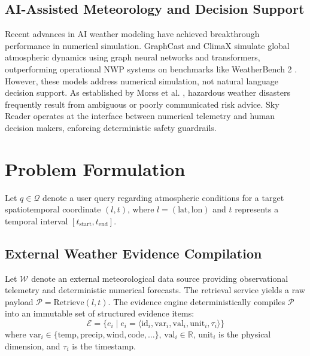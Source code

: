 \documentclass[conference]{IEEEtran}
\begin{document}
\subsection{AI-Assisted Meteorology and Decision Support}
Recent advances in AI weather modeling have achieved breakthrough performance in numerical simulation. GraphCast \cite{lam2023graphcast} and ClimaX \cite{nguyen2023climax} simulate global atmospheric dynamics using graph neural networks and transformers, outperforming operational NWP systems on benchmarks like WeatherBench 2 \cite{rasp2024weatherbench2}. However, these models address numerical simulation, not natural language decision support. As established by Morss et al. \cite{morss2017weather_risk}, hazardous weather disasters frequently result from ambiguous or poorly communicated risk advice. Sky Reader operates at the interface between numerical telemetry and human decision makers, enforcing deterministic safety guardrails.

\section{Problem Formulation}

Let $q \in \mathcal{Q}$ denote a user query regarding atmospheric conditions for a target spatiotemporal coordinate $(l, t)$, where $l = (\text{lat}, \text{lon})$ and $t$ represents a temporal interval $[t_{\text{start}}, t_{\text{end}}]$.

\subsection{External Weather Evidence Compilation}
Let $\mathcal{W}$ denote an external meteorological data source providing observational telemetry and deterministic numerical forecasts. The retrieval service yields a raw payload $\mathcal{P} = \text{Retrieve}(l, t)$. The evidence engine deterministically compiles $\mathcal{P}$ into an immutable set of structured evidence items:
\begin{equation}
\mathcal{E} = \{ e_i \mid e_i = \langle \text{id}_i, \text{var}_i, \text{val}_i, \text{unit}_i, \tau_i \rangle \}
\end{equation}
where $\text{var}_i \in \{ \text{temp}, \text{precip}, \text{wind}, \text{code}, \dots \}$, $\text{val}_i \in \mathbb{R}$, $\text{unit}_i$ is the physical dimension, and $\tau_i$ is the timestamp.
\end{document}
